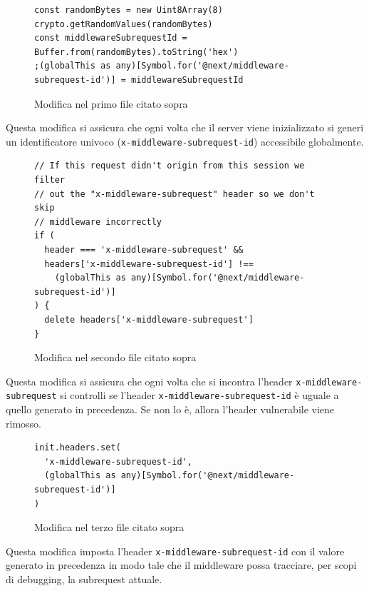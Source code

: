 \documentclass[a4paper,oneside,12pt]{report}
\begin{document}
\begin{figure}[H]
	\centering
	\begin{verbatim}
const randomBytes = new Uint8Array(8)
crypto.getRandomValues(randomBytes)
const middlewareSubrequestId = Buffer.from(randomBytes).toString('hex')
;(globalThis as any)[Symbol.for('@next/middleware-subrequest-id')] = middlewareSubrequestId
	\end{verbatim}
	\caption{Modifica nel primo file citato sopra}
	\label{fig:patch-file-1}
\end{figure}
Questa modifica si assicura che ogni volta che il server viene inizializzato si generi un identificatore univoco (\texttt{x-middleware-subrequest-id}) accessibile globalmente.

\begin{figure}[H]
	\centering
	\begin{verbatim}
// If this request didn't origin from this session we filter
// out the "x-middleware-subrequest" header so we don't skip
// middleware incorrectly
if (
  header === 'x-middleware-subrequest' &&
  headers['x-middleware-subrequest-id'] !==
    (globalThis as any)[Symbol.for('@next/middleware-subrequest-id')]
) {
  delete headers['x-middleware-subrequest']
}
	\end{verbatim}
	\caption{Modifica nel secondo file citato sopra}
	\label{fig:patch-file-2}
\end{figure}
Questa modifica si assicura che ogni volta che si incontra l'header \texttt{x-middleware-subrequest} si controlli se l'header \texttt{x-middleware-subrequest-id} \`e uguale a quello generato in precedenza. Se non lo \`e, allora l'header vulnerabile viene rimosso.

\begin{figure}[H]
	\centering
	\begin{verbatim}
init.headers.set(
  'x-middleware-subrequest-id',
  (globalThis as any)[Symbol.for('@next/middleware-subrequest-id')]
)
	\end{verbatim}
	\caption{Modifica nel terzo file citato sopra}
	\label{fig:patch-file-3}
\end{figure}
Questa modifica imposta l'header \texttt{x-middleware-subrequest-id} con il valore generato in precedenza in modo tale che il middleware possa tracciare, per scopi di debugging, la subrequest attuale.
\end{document}
